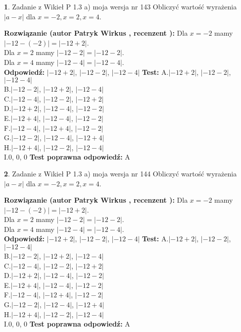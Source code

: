 \documentclass[12pt, a4paper]{article}
\theoremstyle{definition} %
\newtheorem{zad}{}
\newcommand{\zadStart}[1]{\begin{zad}#1\newline}
\newcommand{\zadStop}{\end{zad}}
\newcommand{\rozwStart}[2]{\noindent \textbf{Rozwiązanie (autor #1 , recenzent #2): }\newline}
\newcommand{\rozwStop}{\newline}
\newcommand{\odpStart}{\noindent \textbf{Odpowiedź:}\newline}
\newcommand{\odpStop}{\newline}
\newcommand{\testStart}{\noindent \textbf{Test:}\newline}
\newcommand{\testStop}{\newline}
\newcommand{\kluczStart}{\noindent \textbf{Test poprawna odpowiedź:}\newline}
\newcommand{\kluczStop}{\newline}
\begin{document}
\zadStart{Zadanie z Wikieł P 1.3 a) moja wersja nr 143}
Obliczyć wartość wyrażenia $|a - x|$ dla $x=-2,x=2,x=4$.
\zadStop
\rozwStart{Patryk Wirkus}{}
Dla $x = -2$ mamy $|-12 - (-2)| = |-12 + 2|$.\\
Dla $x = 2$ mamy $|-12 - 2| = |-12 - 2|$.\\
Dla $x = 4$ mamy $|-12 - 4| = |-12 - 4|$.\\
\rozwStop
\odpStart
$|-12 + 2|$, $|-12 - 2|$, $|-12 - 4|$
\odpStop
\testStart
A.$|-12 + 2|$, $|-12 - 2|$, $|-12 - 4|$\\
B.$|-12 - 2|$, $|-12 + 2|$, $|-12 - 4|$\\
C.$|-12 - 4|$, $|-12 - 2|$, $|-12 + 2|$\\
D.$|-12 + 2|$, $|-12 - 4|$, $|-12 - 2|$\\
E.$|-12 + 4|$, $|-12 - 4|$, $|-12 - 2|$\\
F.$|-12 - 4|$, $|-12 + 4|$, $|-12 - 2|$\\
G.$|-12 - 2|$, $|-12 - 4|$, $|-12 + 4|$\\
H.$|-12 + 4|$, $|-12 - 2|$, $|-12 - 4|$\\
I.$0$, $0$, $0$
\testStop
\kluczStart
A
\kluczStop



\zadStart{Zadanie z Wikieł P 1.3 a) moja wersja nr 144}
Obliczyć wartość wyrażenia $|a - x|$ dla $x=-2,x=2,x=4$.
\zadStop
\rozwStart{Patryk Wirkus}{}
Dla $x = -2$ mamy $|-12 - (-2)| = |-12 + 2|$.\\
Dla $x = 2$ mamy $|-12 - 2| = |-12 - 2|$.\\
Dla $x = 4$ mamy $|-12 - 4| = |-12 - 4|$.\\
\rozwStop
\odpStart
$|-12 + 2|$, $|-12 - 2|$, $|-12 - 4|$
\odpStop
\testStart
A.$|-12 + 2|$, $|-12 - 2|$, $|-12 - 4|$\\
B.$|-12 - 2|$, $|-12 + 2|$, $|-12 - 4|$\\
C.$|-12 - 4|$, $|-12 - 2|$, $|-12 + 2|$\\
D.$|-12 + 2|$, $|-12 - 4|$, $|-12 - 2|$\\
E.$|-12 + 4|$, $|-12 - 4|$, $|-12 - 2|$\\
F.$|-12 - 4|$, $|-12 + 4|$, $|-12 - 2|$\\
G.$|-12 - 2|$, $|-12 - 4|$, $|-12 + 4|$\\
H.$|-12 + 4|$, $|-12 - 2|$, $|-12 - 4|$\\
I.$0$, $0$, $0$
\testStop
\kluczStart
A
\kluczStop
\end{document}
